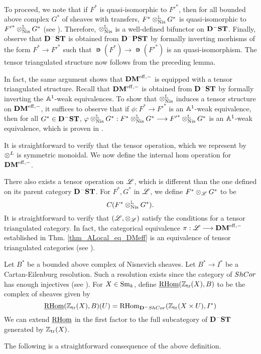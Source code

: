 To proceed, we note that if $F^*$ is quasi-isomorphic to ${F'}^*$,
then for all bounded above complex $G^*$ of sheaves with transfers, 
$F^* \tLNis G^*$ is quasi-isomorphic to ${F'}^* \tLNis G^*$ (see
\cite[Prop. 8.16]{MVW}). Therefore, $\tLNis$ is a well-defined 
bifunctor on $\DShCor$. Finally, observe that $\DShCor$ is 
obtained from $\DCat^-\PST$ by formally inverting morhisms of the 
form $F^* \to {F'}^*$ such that $\nis(F^*) \to \nis({F'}^*)$ is an 
quasi-isomorphism. The tensor triangulated structure now follows 
from the preceding lemma.

In fact, the same argument shows that $\DMeff$ is equipped with a
tensor triangulated structure. Recall that $\DMeff$ is obtained
from $\DShCor$ by formally inverting the $\A^1$-weak equivalences.
To show that $\tLNis$ induces a tensor structure on $\DMeff$, it
suffices to observe that if $\phi : F^* \to {F'}^*$ is an $\A^1$-weak 
equivalence, then for all $G^* \in \DShCor$, $\phi \tLNis G^* : 
F^* \tLNis G^* \to {F'}^* \tLNis G^*$ is an $\A^1$-weak 
equivalence, which is proven in \cite[Lemma 9.5]{MVW}.

It is straightforward to verify that the tensor operation, which
we represent by $\tDM$ is symmetric monoidal. We now define the 
internal hom operation for $\DMeff$.

There also exists a tensor operation on $\ALocal$, which is 
different than the one defined on its parent category $\DShCor$.
For $F^*, G^*$ in $\ALocal$, we define $F^* \tAL G^*$ to be
\[
\suslC[]( F^* \tLNis G^* ).
\]
It is straightforward to verify that $(\ALocal, \tAL)$ satisfy
the conditions for a tensor triangulated category. In fact, the
categorical equivalence $\pi : \ALocal \to \DMeff$ established
in Thm. \ref{thm_ALocal_eq_DMeff} is an equivalence of tensor
triangulated categories (see \cite[Theorem 14.11]{MVW}).

\begin{defn}
Let $B^*$ be a bounded above complex of Nisnevich sheaves. Let $B^*
\to I^*$ be a Cartan-Eilenburg resolution. Such a resolution 
exists since the category of $\ShCor$ has enough injectives (see 
\cite[Prop.  6.19]{MVW}). For $X \in \Sm$, define 
$\sheaf{\rhom}(\Ztr(X), B)$ to be the complex of sheaves given by
\[
\sheaf{\rhom}(\Ztr(X), B)(U) = \rhom_{\DCat^-\ShCor}(\Ztr(X \times U),
I^*)
\]
We can extend $\sheaf{\rhom}$ in the first factor to the full 
subcategory of $\DShCor$ generated by $\Ztr(X)$.
\end{defn}

The following is a straightforward consequence of the above 
definition.

